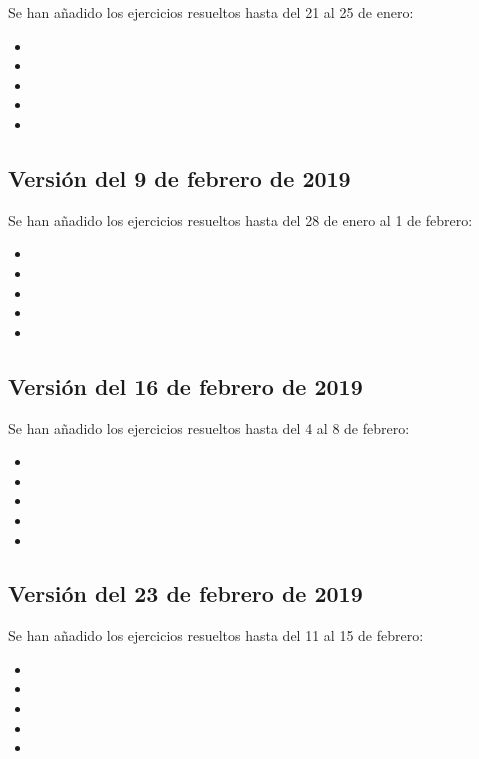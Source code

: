 \documentclass[a4paper,12pt,twoside]{book}
\begin{document}
Se han añadido los ejercicios resueltos hasta del 21 al 25 de enero:

\begin{itemize}
\item {}
\item {}
\item {}
\item {}
\item {}
\end{itemize}

\subsection*{Versión del 9 de febrero de 2019}

Se han añadido los ejercicios resueltos hasta del 28 de enero al 1 de
febrero:

\begin{itemize}
\item {}
\item {}
\item {}
\item {}
\item {}
\end{itemize}

\subsection*{Versión del 16 de febrero de 2019}

Se han añadido los ejercicios resueltos hasta del 4 al 8 de febrero:

\begin{itemize}
\item {}
\item {}
\item {}
\item {}
\item {}
\end{itemize}

\subsection*{Versión del 23 de febrero de 2019}

Se han añadido los ejercicios resueltos hasta del 11 al 15 de febrero:

\begin{itemize}
\item {}
\item {}
\item {}
\item {}
\item {}
\end{itemize}
\end{document}
